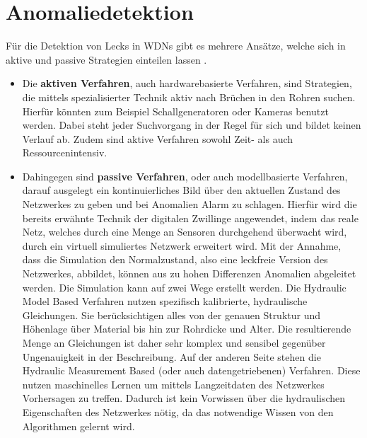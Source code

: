 \chapter{Anomaliedetektion}

Für die Detektion von Lecks in WDNs gibt es mehrere Ansätze, welche sich in aktive und passive
 Strategien einteilen lassen \cite{lee2021development}.

\begin{itemize}
    
    \item Die \textbf{aktiven Verfahren}, auch hardwarebasierte Verfahren, sind Strategien, die mittels
     spezialisierter Technik aktiv nach Brüchen in den Rohren suchen. Hierfür könnten zum Beispiel
     Schallgeneratoren oder Kameras benutzt werden. Dabei steht jeder Suchvorgang in der Regel für sich
     und bildet keinen Verlauf ab. Zudem sind aktive Verfahren sowohl Zeit- als auch Ressourcenintensiv.

    \item Dahingegen sind \textbf{passive Verfahren}, oder auch modellbasierte Verfahren, darauf ausgelegt
     ein kontinuierliches Bild über den aktuellen Zustand des Netzwerkes zu geben und bei Anomalien Alarm zu
     schlagen. Hierfür wird die bereits erwähnte Technik der digitalen Zwillinge angewendet, indem das reale
     Netz, welches durch eine Menge an Sensoren durchgehend überwacht wird, durch ein virtuell simuliertes
     Netzwerk erweitert wird. Mit der Annahme, dass die Simulation den Normalzustand, also eine leckfreie
     Version des Netzwerkes, abbildet, können aus zu hohen Differenzen Anomalien abgeleitet werden. Die
     Simulation kann auf zwei Wege erstellt werden. Die Hydraulic Model Based Verfahren nutzen spezifisch
     kalibrierte, hydraulische Gleichungen. Sie berücksichtigen alles von der genauen Struktur und Höhenlage
     über Material bis hin zur Rohrdicke und Alter. Die resultierende Menge an Gleichungen ist daher sehr
     komplex und sensibel gegenüber Ungenauigkeit in der Beschreibung. Auf der anderen Seite stehen die
     Hydraulic Measurement Based (oder auch datengetriebenen) Verfahren. Diese nutzen maschinelles Lernen um
     mittels Langzeitdaten des Netzwerkes Vorhersagen zu treffen. Dadurch ist kein Vorwissen über die
     hydraulischen Eigenschaften des Netzwerkes nötig, da das notwendige Wissen von den Algorithmen gelernt wird.
    
\end{itemize}

